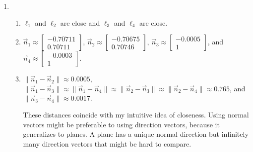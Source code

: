 \documentclass[red]{tutorial}
\newcommand{\mat}[1]{\begin{bmatrix}#1\end{bmatrix}}
\theoremstyle{definition}
\theoremstyle{theorem}
\begin{document}
\begin{solutions}
\begin{enumerate}
			\item \begin{enumerate}
				\item $\ell_1$ and $\ell_2$ are close and $\ell_3$ and $\ell_4$ are close.
				\item $\vec n_1\approx\mat{-0.70711\\0.70711}$, 
					$\vec n_2\approx\mat{-0.70675\\0.70746}$,
					$\vec n_3\approx\mat{-0.0005\\1}$, and $\vec n_4\approx\mat{-0.0003\\1}$.
				\item 
					$\|\vec n_1-\vec n_2\|\approx 0.0005$, 
					$\|\vec n_1-\vec n_3\|\approx \|\vec n_1-\vec n_4\| 
					\approx \|\vec n_2-\vec n_3\|\approx \|\vec n_2-\vec n_4\|\approx 0.765$,
					and
					$\|\vec n_3-\vec n_4\|\approx 0.0017$. 

					These distances coincide with my intuitive idea of closeness. Using normal
					vectors might be preferable to using direction vectors, because it generalizes to
					planes. A plane has a unique
					normal direction but infinitely many direction vectors that might be hard to compare.
			\end{enumerate}
		\end{enumerate}
	\end{solutions}
\end{document}
